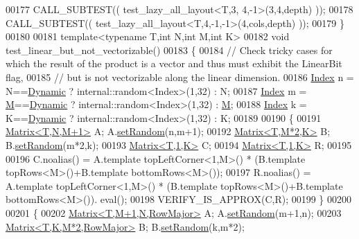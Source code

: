 \begin{DoxyCode}
00177   CALL\_SUBTEST(( test\_lazy\_all\_layout<T,3, 4,-1>(3,4,depth) ));
00178   CALL\_SUBTEST(( test\_lazy\_all\_layout<T,4,-1,-1>(4,cols,depth) ));
00179 \}
00180 
00181 \textcolor{keyword}{template}<\textcolor{keyword}{typename} T,\textcolor{keywordtype}{int} N,\textcolor{keywordtype}{int} M,\textcolor{keywordtype}{int} K>
00182 \textcolor{keywordtype}{void} test\_linear\_but\_not\_vectorizable()
00183 \{
00184   \textcolor{comment}{// Check tricky cases for which the result of the product is a vector and thus must exhibit the LinearBit
       flag,}
00185   \textcolor{comment}{// but is not vectorizable along the linear dimension.}
00186   \hyperlink{namespace_eigen_a62e77e0933482dafde8fe197d9a2cfde}{Index} n = N==\hyperlink{namespace_eigen_ad81fa7195215a0ce30017dfac309f0b2}{Dynamic} ? internal::random<Index>(1,32) : N;
00187   \hyperlink{namespace_eigen_a62e77e0933482dafde8fe197d9a2cfde}{Index} m = \hyperlink{group___core___module_class_eigen_1_1_matrix}{M}==\hyperlink{namespace_eigen_ad81fa7195215a0ce30017dfac309f0b2}{Dynamic} ? internal::random<Index>(1,32) : \hyperlink{group___core___module_class_eigen_1_1_matrix}{M};
00188   \hyperlink{namespace_eigen_a62e77e0933482dafde8fe197d9a2cfde}{Index} k = K==\hyperlink{namespace_eigen_ad81fa7195215a0ce30017dfac309f0b2}{Dynamic} ? internal::random<Index>(1,32) : K;
00189 
00190   \{
00191     \hyperlink{group___core___module_class_eigen_1_1_matrix}{Matrix<T,N,M+1>} A; A.\hyperlink{class_eigen_1_1_plain_object_base_af0e576a0e1aefc9ee346de44cc352ba3}{setRandom}(n,m+1);
00192     \hyperlink{group___core___module_class_eigen_1_1_matrix}{Matrix<T,M*2,K>} B; B.\hyperlink{class_eigen_1_1_plain_object_base_af0e576a0e1aefc9ee346de44cc352ba3}{setRandom}(m*2,k);
00193     \hyperlink{group___core___module_class_eigen_1_1_matrix}{Matrix<T,1,K>} C;
00194     \hyperlink{group___core___module_class_eigen_1_1_matrix}{Matrix<T,1,K>} R;
00195 
00196     C.noalias() = A.template topLeftCorner<1,M>() * (B.template topRows<M>()+B.template bottomRows<M>());
00197     R.noalias() = A.template topLeftCorner<1,M>() * (B.template topRows<M>()+B.template bottomRows<M>()).
      eval();
00198     VERIFY\_IS\_APPROX(C,R);
00199   \}
00200 
00201   \{
00202     \hyperlink{group___core___module_class_eigen_1_1_matrix}{Matrix<T,M+1,N,RowMajor>} A; A.\hyperlink{class_eigen_1_1_plain_object_base_af0e576a0e1aefc9ee346de44cc352ba3}{setRandom}(m+1,n);
00203     \hyperlink{group___core___module_class_eigen_1_1_matrix}{Matrix<T,K,M*2,RowMajor>} B; B.\hyperlink{class_eigen_1_1_plain_object_base_af0e576a0e1aefc9ee346de44cc352ba3}{setRandom}(k,m*2);

\end{DoxyCode}
